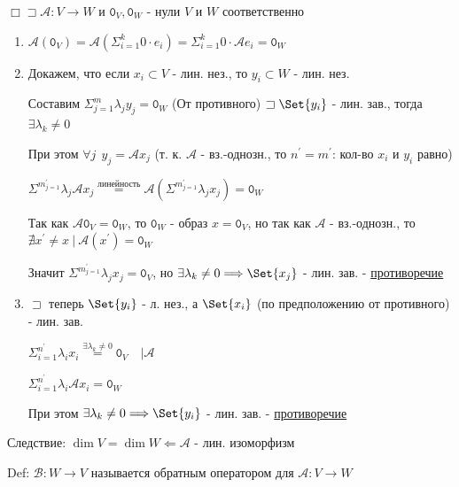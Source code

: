 \documentclass[12pt]{article}
\begin{document}
    $\Box \sqsupset \mathcal{A} : V \rightarrow W$ и $\texttt{0}_V, \texttt{0}_W$ - нули $V$ и $W$ соответственно
    \begin{enumerate}
        \item $\mathcal{A}(\texttt{0}_V) = \mathcal{A}(\Sigma^k_{i=1} 0 \cdot e_i) = \Sigma^k_{i=1} 0 \cdot \mathcal{A}e_i = \texttt{0}_W$

        \item Докажем, что если ${x_i} \subset V$ - лин. нез., то ${y_i} \subset W$ - лин. нез.

        Составим $\Sigma^m_{j=1} \lambda_j y_j = \texttt{0}_W$ (От противного) $\sqsupset \Set{y_i}$ - лин. зав., тогда $\exists \lambda_k \neq 0$

        При этом $\forall j \ \ y_j = \mathcal{A}x_j$ (т. к. $\mathcal{A}$ - вз.-однозн., то $n^\prime = m^\prime$: кол-во $x_i$ и $y_i$ равно)

        $\Sigma^m^\prime_{j=1} \lambda_j \mathcal{A}x_j \stackrel{\text{линейность}}{=} \mathcal{A} (\Sigma^m^\prime_{j=1} \lambda_j x_j) = \texttt{0}_W$

        Так как $\mathcal{A}\texttt{0}_V = \texttt{0}_W$, то $\texttt{0}_W$ - образ $x = \texttt{0}_V$, но так как $\mathcal{A}$ - вз.-однозн., то
        $\nexists x^\prime \neq x \ | \ \mathcal{A}(x^\prime) = \texttt{0}_W$

        Значит $\Sigma^m^\prime_{j=1} \lambda_j x_j = \texttt{0}_V$, но $\exists \lambda_k \neq 0 \Longrightarrow \Set{x_j}$ - лин. зав. - \underline{противоречие}

        \item $\sqsupset$ теперь $\Set{y_i}$ - л. нез., а $\Set{x_i}$ (по предположению от противного) - лин. зав.

        $\Sigma^{n^\prime}_{i = 1} \lambda_i x_i \stackrel{\exists \lambda_k \neq 0}{=} \texttt{0}_V \quad \Big| \mathcal{A}$

        $\Sigma^{n^\prime}_{i = 1} \lambda_i \mathcal{A}x_i = \texttt{0}_W$

        При этом $\exists \lambda_k \neq 0 \Longrightarrow \Set{y_i}$ - лин. зав. - \underline{противоречие}

    \end{enumerate}

    Следствие: $\dim V = \dim W \Longleftarrow \mathcal{A}$ - лин. изоморфизм

    Def: $\mathcal{B} : W \rightarrow V$ называется обратным оператором для $\mathcal{A} : V \rightarrow W$
\end{document}
